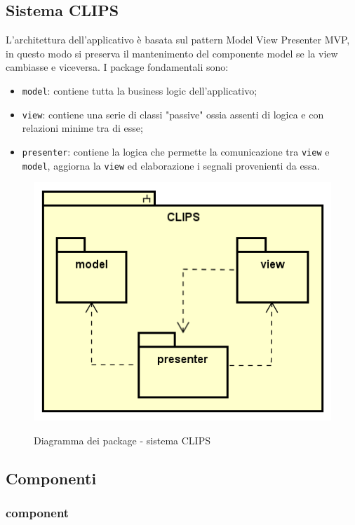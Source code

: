 \documentclass[../DefinizioneDiProdotto.tex]{subfiles}
\begin{document}
	\subsection{Sistema CLIPS}
		L'architettura dell'applicativo è basata sul pattern Model View Presenter MVP, in questo modo si preserva il mantenimento del componente model se la view cambiasse e viceversa. I package fondamentali sono:
		\begin{itemize}
			\item \verb|model|: contiene tutta la business logic dell'applicativo;
			\item \verb|view|: contiene una serie di classi "passive" ossia assenti di logica e con relazioni minime tra di esse;
			\item \verb|presenter|: contiene la logica che permette la comunicazione tra \verb|view| e \verb|model|, aggiorna la \verb|view| ed elaborazione i segnali provenienti da essa.
		\end{itemize}
		
		\begin{figure} [h]
			\centering
			\includegraphics[scale=0.8]{img/package/CLIPS}
			\label{CLIPS}
			\caption{Diagramma dei package - sistema CLIPS}
		\end{figure}
		
	
\subsection{Componenti}

\subsubsection{component}
\end{document}
